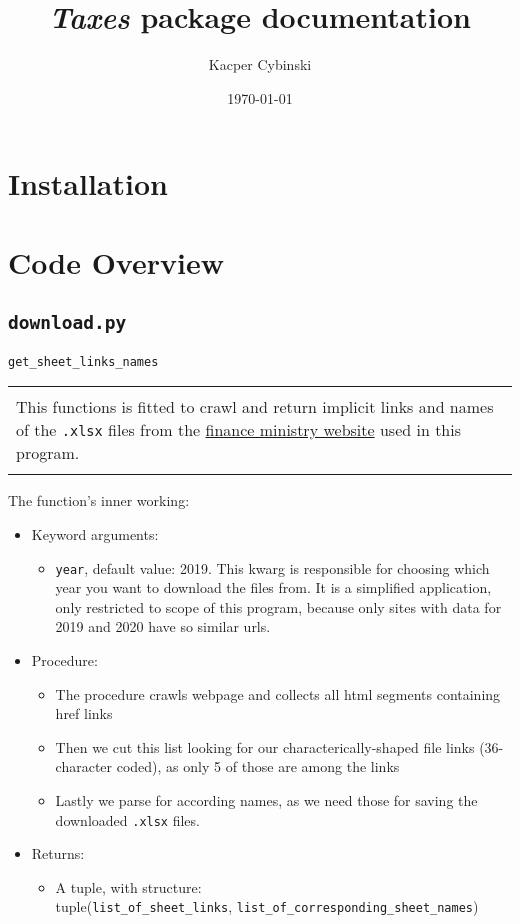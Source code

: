 \documentclass[12pt,a4paper]{article}
\title{\textit{Taxes} package documentation}
\author{Kacper Cybinski}
\date{\today}
\newcommand{\code}[1]{\texttt{#1}}
\newenvironment{func}[1]
    {\begin{center}
    #1\\[1ex]
    \begin{tabular}{|p{0.9\textwidth}|}
    \hline\\
    }
    {
    \\\\\hline
    \end{tabular}
    \end{center}
    }
\begin{document}
\newenvironment{details}[3]
    {The function's inner working:
    \begin{itemize}
    \item Keyword arguments: \begin{itemize}
    #1
    \end{itemize}
    \item Procedure: \begin{itemize}
    #2
    \end{itemize}
    \item Returns: \begin{itemize}
    #3
    \end{itemize}
    \end{itemize}
    }
    {
    \bigskip
    }

\maketitle

\section{Installation}

\section{Code Overview}

\subsection{\code{download.py}}

\begin{func}{\texttt{get\_sheet\_links\_names}}
This functions is fitted to crawl and return implicit links and names of the \code{.xlsx} files from the  \href{https://www.gov.pl/web/finanse/udzialy-za-2020-r}{finance ministry website} used in this program.
\end{func}

\begin{details}{
\item \code{year}, default value: 2019. This kwarg is responsible for choosing which year you want to download the files from. It is a simplified application, only restricted to scope of this program, because only sites with data for 2019 and 2020 have so similar urls.
}{
\item The procedure crawls webpage and collects all html segments containing href links
\item Then we cut this list looking for our characterically-shaped file links (36-character coded), as only 5 of those are among the links
\item Lastly we parse for according names, as we need those for saving the downloaded \code{.xlsx} files.
}{
\item A tuple, with structure: \\tuple(\code{list\_of\_sheet\_links}, \code{list\_of\_corresponding\_sheet\_names})
}
\end{details}
\end{document}
